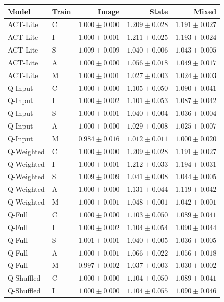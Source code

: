 \documentclass[11pt,a4paper]{article}
\begin{document}
\begin{center}
\footnotesize
\begin{tabular}{llrrr}
\toprule
Model & Train & Image & State & Mixed \\
\midrule
ACT-Lite & C & $1.000\pm0.000$ & $1.209\pm0.028$ & $1.191\pm0.027$ \\
ACT-Lite & I & $1.000\pm0.001$ & $1.211\pm0.025$ & $1.193\pm0.024$ \\
ACT-Lite & S & $1.009\pm0.009$ & $1.040\pm0.006$ & $1.043\pm0.005$ \\
ACT-Lite & A & $1.000\pm0.000$ & $1.056\pm0.018$ & $1.049\pm0.017$ \\
ACT-Lite & M & $1.000\pm0.001$ & $1.027\pm0.003$ & $1.024\pm0.003$ \\
Q-Input & C & $1.000\pm0.000$ & $1.105\pm0.050$ & $1.090\pm0.041$ \\
Q-Input & I & $1.000\pm0.002$ & $1.101\pm0.053$ & $1.087\pm0.042$ \\
Q-Input & S & $1.000\pm0.001$ & $1.040\pm0.004$ & $1.036\pm0.004$ \\
Q-Input & A & $1.000\pm0.000$ & $1.029\pm0.008$ & $1.025\pm0.007$ \\
Q-Input & M & $0.984\pm0.016$ & $1.012\pm0.011$ & $1.000\pm0.020$ \\
Q-Weighted & C & $1.000\pm0.000$ & $1.209\pm0.028$ & $1.191\pm0.027$ \\
Q-Weighted & I & $1.000\pm0.001$ & $1.212\pm0.033$ & $1.194\pm0.031$ \\
Q-Weighted & S & $1.009\pm0.009$ & $1.041\pm0.008$ & $1.044\pm0.005$ \\
Q-Weighted & A & $1.000\pm0.000$ & $1.131\pm0.044$ & $1.119\pm0.042$ \\
Q-Weighted & M & $1.000\pm0.001$ & $1.048\pm0.001$ & $1.042\pm0.001$ \\
Q-Full & C & $1.000\pm0.000$ & $1.103\pm0.050$ & $1.089\pm0.041$ \\
Q-Full & I & $1.000\pm0.002$ & $1.104\pm0.054$ & $1.090\pm0.044$ \\
Q-Full & S & $1.001\pm0.001$ & $1.040\pm0.005$ & $1.036\pm0.005$ \\
Q-Full & A & $1.000\pm0.001$ & $1.066\pm0.022$ & $1.056\pm0.018$ \\
Q-Full & M & $0.997\pm0.002$ & $1.037\pm0.003$ & $1.030\pm0.002$ \\
Q-Shuffled & C & $1.000\pm0.000$ & $1.104\pm0.050$ & $1.089\pm0.041$ \\
Q-Shuffled & I & $1.000\pm0.000$ & $1.104\pm0.055$ & $1.090\pm0.046$ \\

\end{tabular}
\end{center}
\end{document}
